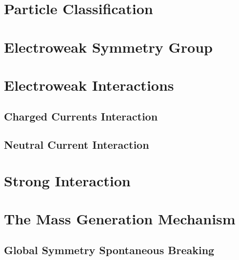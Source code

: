 \documentclass[10pt,twoside,cucitura,classica,english,openany]{toptesi}
\begin{document}


\section{Particle Classification}
\label{sec:standard-model}



\section{Electroweak Symmetry Group}
\label{sec:electro-weak-symm}



\section{Electroweak Interactions}
\label{sec:electro-weak-inter}



\subsection{Charged Currents Interaction}
\label{sec:charg-curr-inter}



\subsection{Neutral Current Interaction}
\label{sec:neutr-curr-inter}



\section{Strong Interaction}
\label{sec:strong-int}



\section{The Mass Generation Mechanism}
\label{sec:higgs-mechanism}



\subsection{Global Symmetry Spontaneous Breaking}
\label{sec:glob-symm-break}
\end{document}
